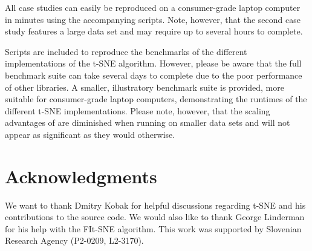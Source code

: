 \documentclass[article]{jss}
\newcommand{\opentsne}{\pkg{openTSNE}\xspace}
\begin{document}
All case studies can easily be reproduced on a consumer-grade laptop computer in minutes using the accompanying scripts. Note, however, that the second case study features a large data set and may require up to several hours to complete.

Scripts are included to reproduce the benchmarks of the different implementations of the t-SNE algorithm. However, please be aware that the full benchmark suite can take several days to complete due to the poor performance of other libraries. A smaller, illustratory benchmark suite is provided, more suitable for consumer-grade laptop computers, demonstrating the runtimes of the different t-SNE implementations. Please note, however, that the scaling advantages of \opentsne are diminished when running on smaller data sets and will not appear as significant as they would otherwise.


\section*{Acknowledgments}

We want to thank Dmitry Kobak for helpful discussions regarding t-SNE and his
contributions to the source code. We would also like to thank George Linderman
for his help with the FIt-SNE algorithm. This work was supported by Slovenian
Research Agency (P2-0209, L2-3170).





\newpage
\end{document}
